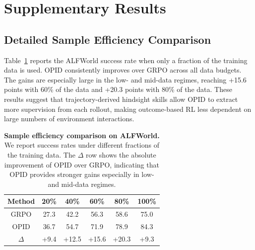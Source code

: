 \documentclass{llmxive}
\providecommand{\arraystretch}{1.08}
\begin{document}
\section{Supplementary Results}\label{app:supp_results}

\subsection{Detailed Sample Efficiency Comparison}
\label{app:sample_efficiency}
Table~\ref{tab:sample_efficiency} reports the ALFWorld success rate when only a fraction of the training data is used. OPID consistently improves over GRPO across all data budgets. The gains are especially large in the low- and mid-data regimes, reaching +15.6 points with 60\% of the data and +20.3 points with 80\% of the data. These results suggest that trajectory-derived hindsight skills allow OPID to extract more supervision from each rollout, making outcome-based RL less dependent on large numbers of environment interactions.

\begin{table}[htbp]
\centering
\vspace{0.05in}
\label{tab:sample_efficiency}
\setlength{\tabcolsep}{8pt}
\renewcommand{\arraystretch}{1.08}
\begin{tabular}{cccccc}
\toprule
\textbf{Method} & \textbf{20\%} & \textbf{40\%} & \textbf{60\%} & \textbf{80\%} & \textbf{100\%} \\
\midrule
GRPO & 27.3 & 42.2 & 56.3 & 58.6 & 75.0 \\
\rowcolor{gray!10}
OPID & 36.7 & 54.7 & 71.9 & 78.9 & 84.3 \\
\rowcolor{blue!6}
$\Delta$ & +9.4 & +12.5 & +15.6 & +20.3 & +9.3 \\
\bottomrule
\end{tabular}
\caption{\textbf{Sample efficiency comparison on ALFWorld.} We report success rates under different fractions of the training data. The $\Delta$ row shows the absolute improvement of OPID over GRPO, indicating that OPID provides stronger gains especially in low- and mid-data regimes.}
\end{table}
\end{document}
